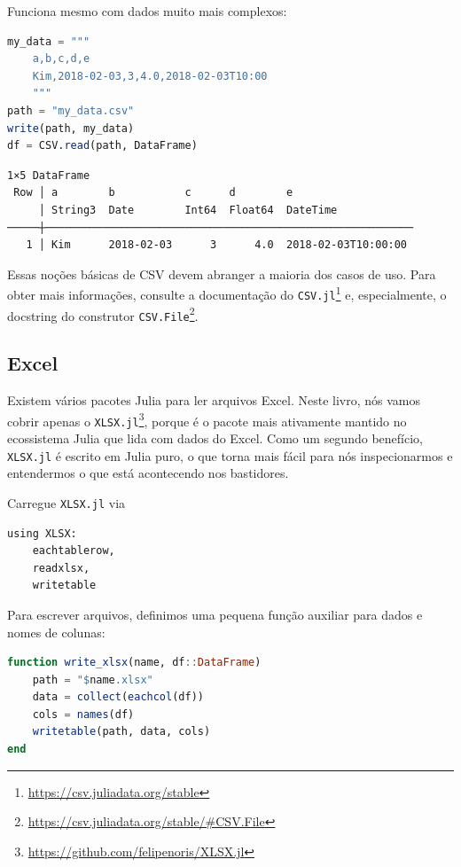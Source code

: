 \documentclass[
  notoc %
]{tufte-book}
\DeclareRobustCommand{\href}[2]{#2\footnote{\url{#1}}}
\newcommand{\passthrough}[1]{#1}
\begin{document}
Funciona mesmo com dados muito mais complexos:

\begin{lstlisting}[language=Julia]
my_data = """
    a,b,c,d,e
    Kim,2018-02-03,3,4.0,2018-02-03T10:00
    """
path = "my_data.csv"
write(path, my_data)
df = CSV.read(path, DataFrame)
\end{lstlisting}

\begin{lstlisting}[language=Output]
1×5 DataFrame
 Row │ a        b           c      d        e
     │ String3  Date        Int64  Float64  DateTime
─────┼──────────────────────────────────────────────────────────
   1 │ Kim      2018-02-03      3      4.0  2018-02-03T10:00:00
\end{lstlisting}

Essas noções básicas de CSV devem abranger a maioria dos casos de uso.
Para obter mais informações, consulte a
\href{https://csv.juliadata.org/stable}{documentação do
\passthrough{\lstinline!CSV.jl!}} e, especialmente, o
\href{https://csv.juliadata.org/stable/\#CSV.File}{docstring do
construtor \passthrough{\lstinline!CSV.File!}}.

\hypertarget{sec:excel}{%
\subsection{Excel}\label{sec:excel}}

Existem vários pacotes Julia para ler arquivos Excel. Neste livro, nós
vamos cobrir apenas o
\href{https://github.com/felipenoris/XLSX.jl}{\passthrough{\lstinline!XLSX.jl!}},
porque é o pacote mais ativamente mantido no ecossistema Julia que lida
com dados do Excel. Como um segundo benefício,
\passthrough{\lstinline!XLSX.jl!} é escrito em Julia puro, o que torna
mais fácil para nós inspecionarmos e entendermos o que está acontecendo
nos bastidores.

Carregue \passthrough{\lstinline!XLSX.jl!} via

\begin{lstlisting}
using XLSX:
    eachtablerow,
    readxlsx,
    writetable
\end{lstlisting}

Para escrever arquivos, definimos uma pequena função auxiliar para dados
e nomes de colunas:

\begin{lstlisting}[language=Julia]
function write_xlsx(name, df::DataFrame)
    path = "$name.xlsx"
    data = collect(eachcol(df))
    cols = names(df)
    writetable(path, data, cols)
end
\end{lstlisting}
\end{document}
